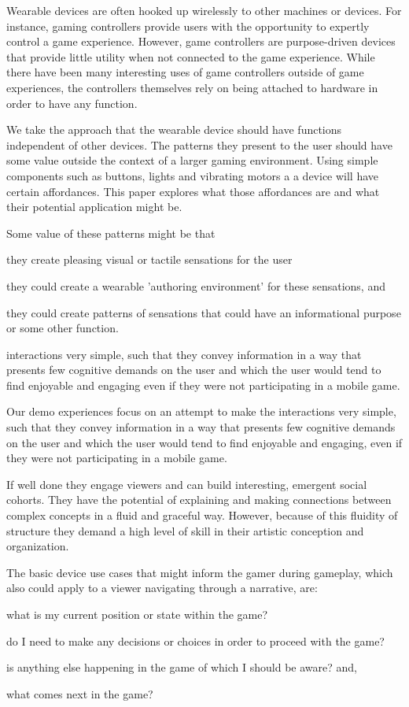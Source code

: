 \documentclass{chi-ext}
\begin{document}
Wearable devices are often hooked up wirelessly to other machines or devices. For instance, gaming controllers provide users with the opportunity to expertly control a game experience. However, game controllers are purpose-driven devices that provide little utility when not connected to the game experience. While there have been many interesting uses of game controllers outside of game experiences, the controllers themselves rely on being attached to hardware in order to have any function. 

We take the approach that the wearable device should have functions independent of other devices. The patterns they present to the user should have some value outside the context of a larger gaming environment. Using simple components such as buttons, lights and vibrating motors a a device will have certain affordances. This paper explores what those affordances are and what their potential application might be. 

Some value of these patterns might be that 
\begin{inparaenum}
\item they create pleasing visual or tactile sensations for the user
\item they could create a wearable 'authoring environment' for these sensations, and
\item they could create patterns of sensations that could have an informational purpose or some other function. 
\end{inparaenum}

interactions very simple, such that they convey information in a way that presents few cognitive demands on the user and which the user would tend to find enjoyable and engaging even if they were not participating in a mobile game. 

Our demo experiences focus on an attempt to make the interactions very simple, such that they convey information in a way that presents few cognitive demands on the user and which the user would tend to find enjoyable and engaging, even if they were not participating in a mobile game. 

If well done they engage viewers and can build interesting, emergent social cohorts. They have the potential of explaining and making connections between complex concepts in a fluid and graceful way. However, because of this fluidity of structure they demand a high level of skill in their artistic conception and organization. 

The basic device use cases that might inform the gamer during gameplay, which also could apply to a viewer navigating through a narrative, are: 
\begin{inparaenum}
  \item what is my current position or state within the game?
  \item do I need to make any decisions or choices in order to proceed with the game?
  \item is anything else happening in the game of which I should be aware? and,
  \item what comes next in the game? 
\end{inparaenum}
\end{document}
